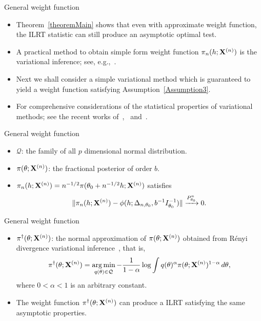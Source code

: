 \documentclass{beamer}
\DeclareMathOperator*{\argmin}{arg\,min}
\theoremstyle{plain}
\theoremstyle{definition}
\theoremstyle{remark}
\begin{document}
\begin{frame}{General weight function}
    \begin{itemize}
        \item
Theorem~\ref{theoremMain} shows that even with approximate weight function, the ILRT statistic can still produce an asymptotic optimal test.
\item
A practical method to obtain simple form weight function $\pi_n(h;\mathbf{X}^{(n)})$ is the variational inference; see, e.g.,~\cite{blei2017}.
\item
Next we shall consider a simple variational method which is guaranteed to yield a weight function satisfying Assumption~\ref{Assumption3}.
\item
For comprehensive considerations of the statistical properties of variational methods; see the recent works of~\cite{yixin2017},~\cite{pati2017} and~\cite{yunyang2017}.
\end{itemize}
\end{frame}
\begin{frame}{General weight function}
    \begin{itemize}
        \item 
$\mathcal{Q}$: the family of all $p$ dimensional normal distribution.
\item
$\pi(\theta;\mathbf{X}^{(n)})$: the fractional posterior of order $b$.
\item
$\pi_n(h;\mathbf{X}^{(n)})=n^{-1/2}\pi(\theta_0+n^{-1/2}h;\mathbf{X}^{(n)})$ satisfies
\begin{equation*}\label{eq:xiebuwanlaaa}
    \|\pi_n(h;\mathbf{X}^{(n)})-\phi(h;\Delta_{n,\theta_0},b^{-1}I_{\theta_0}^{-1})\| \xrightarrow{P_{\theta_0}^n}0.
\end{equation*}
    \end{itemize}
\end{frame}
\begin{frame}{General weight function}
    \begin{itemize}
        \item 
$\pi^{\dagger}(\theta;\mathbf{X}^{(n)})$: the normal approximation of $\pi(\theta;\mathbf{X}^{(n)})$ obtained from R\'{e}nyi divergence variational inference~\cite{NIPS2016_6208}, that is,
    $$
    \pi^{\dagger}(\theta;\BX^{(n)})=\argmin_{q(\theta)\in\mathcal{Q}} -\frac{1}{1-\alpha} \log \int q(\theta)^{\alpha} \pi(\theta;\BX^{(n)})^{1-\alpha}\, d\theta,
    $$
    where $0<\alpha<1$ is an arbitrary constant.
        \item
    The weight function $\pi^{\dagger}(\theta;\mathbf{X}^{(n)})$ can produce a ILRT satisfying the same asymptotic properties.
    \end{itemize}
\end{frame}
\end{document}
